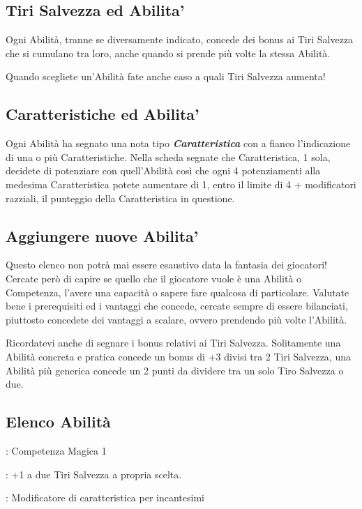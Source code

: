 \begin{multicols}{2}
\subsection{Tiri Salvezza ed Abilita'}\label{tirisalvezzaedabilita}

Ogni Abilità, tranne se diversamente indicato, concede dei bonus ai Tiri Salvezza che si cumulano tra loro, anche quando si prende più volte la stessa Abilità.

Quando scegliete un'Abilità fate anche caso a quali Tiri Salvezza aumenta!

\subsection{Caratteristiche ed Abilita'}\label{caratteristicheedabilita}

Ogni Abilità ha segnato una nota tipo \emph{\textbf{Caratteristica}} con a fianco l'indicazione di una o più Caratteristiche. Nella scheda segnate che Caratteristica, 1 sola, decidete di potenziare con quell'Abilità così che ogni 4 potenziamenti alla medesima Caratteristica potete aumentare di 1, entro il limite di 4 + modificatori razziali, il punteggio della Caratteristica in questione.

\subsection{Aggiungere nuove Abilita'}\label{aggiungereabilita}

Questo elenco non potrà mai essere esaustivo data la fantasia dei giocatori! Cercate però di capire se quello che il giocatore vuole è una Abilità o Competenza, l'avere una capacità o sapere fare qualcosa di particolare.
Valutate bene i prerequisiti ed i vantaggi che concede, cercate sempre di essere bilanciati, piuttosto concedete dei vantaggi a scalare, ovvero prendendo più volte l'Abilità.

Ricordatevi anche di segnare i bonus relativi ai Tiri Salvezza. Solitamente una Abilità concreta e pratica concede un bonus di +3 divisi tra 2 Tiri Salvezza, una Abilità più generica concede un 2 punti da dividere tra un solo Tiro Salvezza o due.

\subsection{Elenco Abilità}

\begin{description}[noitemsep, topsep=0pt, parsep=0pt, partopsep=0pt, leftmargin=0cm, labelwidth=2.5cm]
    \item[\textbf{Requisito}]: Competenza Magica 1
    \item[\textbf{Tiri Salvezza}]: +1 a due Tiri Salvezza a propria scelta.
    \item[\textbf{Caratteristica}]: Modificatore di caratteristica per incantesimi
\end{description}


\end{multicols}
